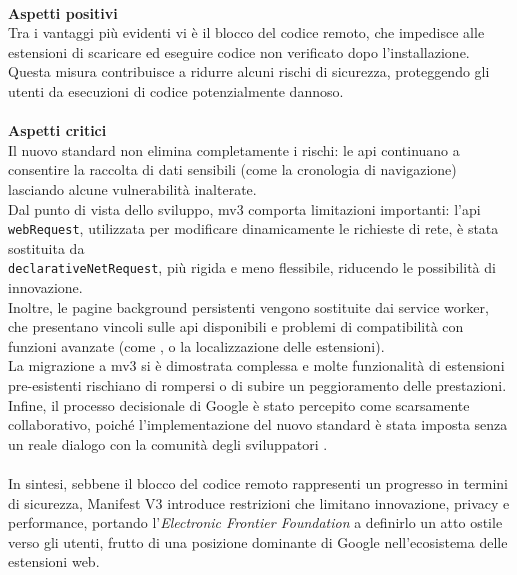 \\
\textbf{Aspetti positivi}\\
Tra i vantaggi più evidenti vi è il blocco del codice remoto, che impedisce alle estensioni di scaricare ed eseguire codice non verificato dopo l’installazione. Questa misura contribuisce a ridurre alcuni rischi di sicurezza, proteggendo gli utenti da esecuzioni di codice potenzialmente dannoso.\\
\\
\textbf{Aspetti critici}\\
Il nuovo standard non elimina completamente i rischi: le \acrshort{api} continuano a consentire la raccolta di dati sensibili (come la cronologia di navigazione) lasciando alcune vulnerabilità inalterate. \\Dal punto di vista dello sviluppo, \acrshort{mv3} comporta limitazioni importanti: l'\acrshort{api} \texttt{webRequest}, utilizzata per modificare dinamicamente le richieste di rete, è stata sostituita da \\ \texttt{declarativeNetRequest}, più rigida e meno flessibile, riducendo le possibilità di innovazione. \\Inoltre, le pagine background persistenti vengono sostituite dai service worker, che presentano vincoli sulle \acrshort{api} disponibili e problemi di compatibilità con funzioni avanzate (come ,  o la localizzazione delle estensioni). 
\\La migrazione a \acrshort{mv3} si è dimostrata complessa e molte funzionalità di estensioni pre-esistenti rischiano di rompersi o di subire un peggioramento delle prestazioni. Infine, il processo decisionale di Google è stato percepito come scarsamente collaborativo, poiché l’implementazione del nuovo standard è stata imposta senza un reale dialogo con la comunità degli sviluppatori \cite{site:mv3-eff}.\\
\\
In sintesi, sebbene il blocco del codice remoto rappresenti un progresso in termini di sicurezza, Manifest V3 introduce restrizioni che limitano innovazione, privacy e performance, portando l’\textit{Electronic Frontier Foundation} a definirlo un atto ostile verso gli utenti, frutto di una posizione dominante di Google nell’ecosistema delle estensioni web.

